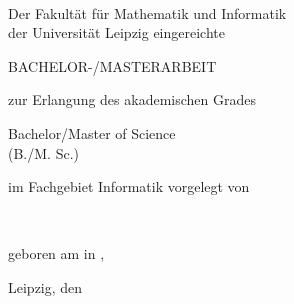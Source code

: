 
\renewcommand{\today}{\ifnum\number\day<10 0\fi \number\day.\space%
\ifcase \month \or Januar \or Februar \or März \or April \or Mai %
\or Juni \or Juli \or August \or September \or Oktober \or November \or Dezember \fi %
\number \year}

\begin{titlepage}
	\begin{addmargin}[-1cm]{-3cm}
    \begin{center}
        \large

        \hfill

        \vfill

        \begingroup
            \color{Maroon}\LARGE{\spacedallcaps{\myTitle}} \\ \bigskip
        \endgroup

        Der Fakultät für Mathematik und Informatik \\
        der Universität Leipzig eingereichte \\\vfill

        {\Huge BACHELOR-/MASTERARBEIT} \vfill\medskip

        zur Erlangung des akademischen Grades \\\vfill

        {\LARGE Bachelor/Master of Science}\\
        (B./M. Sc.)\\\vfill

        im Fachgebiet Informatik vorgelegt von\\\vfill

        \textbf{\myName} \\\vfill

        geboren am {\mybirthday} in {\mybirthtown}, {\mybirthcountry} \\\vfill

        Leipzig, den \myTime\vfill






%
%
%

    \end{center}
  \end{addmargin}
\end{titlepage}
